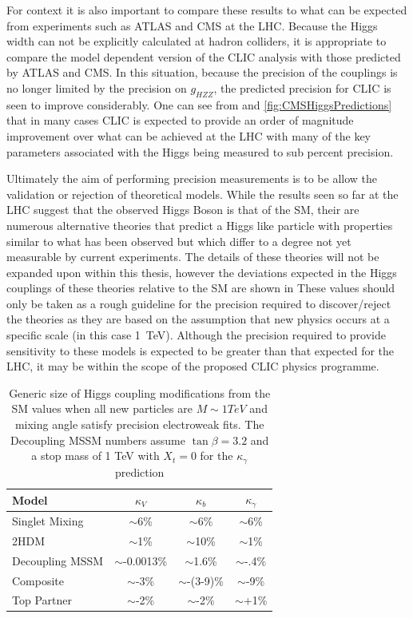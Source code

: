 For context it is also important to compare these results to what can be expected from experiments such as ATLAS and CMS at the LHC. Because the Higgs width can not be explicitly calculated at hadron colliders, it is appropriate to compare the model dependent version of the CLIC analysis with those predicted by ATLAS and CMS. In this situation, because the precision of the couplings is no longer limited by the precision on $g_{HZZ}$, the predicted precision for CLIC is seen to improve considerably. One can see from  and \ref{fig:CMSHiggsPredictions} that in many cases CLIC is expected to provide an order of magnitude improvement over what can be achieved at the LHC with many of the key parameters associated with the Higgs being measured to sub percent precision.

Ultimately the aim of performing precision measurements is to be allow the validation or rejection of theoretical models. While the results seen so far at the LHC suggest that the observed Higgs Boson is that of the \ac{SM}, their are numerous alternative theories that predict a Higgs like particle with properties similar to what has been observed but which differ to a degree not yet measurable by current experiments. The details of these theories will not be expanded upon within this thesis, however the deviations expected in the Higgs couplings of these theories relative to the \ac{SM} are shown in  These values should only be taken as a rough guideline for the precision required to discover/reject the theories as they are based on the assumption that new physics occurs at a specific scale (in this case 1~TeV). Although the precision required to provide sensitivity to these models is expected to be greater than that expected for the LHC, it may be within the scope of the proposed CLIC physics programme.  

\begin{table}
  \centering
  \begin{tabular}{l c c c}
    \toprule
    \toprule
    Model  & $\kappa_V$ & $\kappa_b$ & $\kappa_\gamma$  \\
    \midrule
    Singlet Mixing & $\sim$6\% & $\sim$6\%  & $\sim$6\% \\
    2HDM & $\sim$1\% & $\sim$10\%  & $\sim$1\% \\
    Decoupling MSSM & $\sim$-0.0013\% & $\sim$1.6\%  & $\sim$-.4\% \\
    Composite & $\sim$-3\% & $\sim$-(3-9)\%  & $\sim$-9\% \\
    Top Partner & $\sim$-2\% & $\sim$-2\%  & $\sim$+1\% \\
    \bottomrule
    \bottomrule
  \end{tabular}
  \caption[Predicted Higgs Coupling Modifications for BSM theories]{Generic size of Higgs coupling modifications from the \ac{SM} values when all new particles are $M\sim 1 TeV$ and mixing angle satisfy precision electroweak fits. The Decoupling MSSM numbers assume $\tan\beta = 3.2$ and a stop mass of 1 TeV with $X_t =0$ for the $\kappa_\gamma$ prediction \cite{Dawson:2013bba}}
  \label{table:snowmass}
\end{table}

